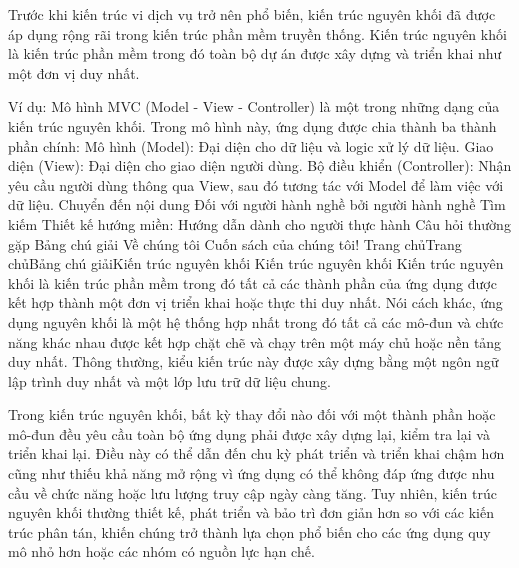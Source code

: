 Trước khi kiến trúc vi dịch vụ trở nên phổ biến, kiến trúc nguyên khối đã được áp dụng rộng rãi trong kiến trúc phần mềm truyền thống. Kiến trúc nguyên khối là kiến trúc phần mềm trong đó toàn bộ dự án được xây dựng và triển khai như một đơn vị duy nhất.

Ví dụ: Mô hình MVC (Model - View - Controller) là một trong những dạng của kiến trúc nguyên khối.
Trong mô hình này, ứng dụng được chia thành ba thành phần chính:
Mô hình (Model): Đại diện cho dữ liệu và logic xử lý dữ liệu.
Giao diện (View): Đại diện cho giao diện người dùng.
Bộ điều khiển (Controller): Nhận yêu cầu người dùng thông qua View, sau đó tương tác với Model để làm việc với dữ liệu.
Chuyển đến nội dung
Đối với người hành nghề bởi người hành nghề
Tìm kiếm
Thiết kế hướng miền: Hướng dẫn dành cho người thực hành
Câu hỏi thường gặp
Bảng chú giải
Về chúng tôi
Cuốn sách của chúng tôi!
Trang chủTrang chủBảng chú giảiKiến trúc nguyên khối
Kiến trúc nguyên khối
Kiến trúc nguyên khối là kiến ​​trúc phần mềm trong đó tất cả các thành phần của ứng dụng được kết hợp thành một đơn vị triển khai hoặc thực thi duy nhất. Nói cách khác, ứng dụng nguyên khối là một hệ thống hợp nhất trong đó tất cả các mô-đun và chức năng khác nhau được kết hợp chặt chẽ và chạy trên một máy chủ hoặc nền tảng duy nhất. Thông thường, kiểu kiến ​​trúc này được xây dựng bằng một ngôn ngữ lập trình duy nhất và một lớp lưu trữ dữ liệu chung.

Trong kiến ​​trúc nguyên khối, bất kỳ thay đổi nào đối với một thành phần hoặc mô-đun đều yêu cầu toàn bộ ứng dụng phải được xây dựng lại, kiểm tra lại và triển khai lại. Điều này có thể dẫn đến chu kỳ phát triển và triển khai chậm hơn cũng như thiếu khả năng mở rộng vì ứng dụng có thể không đáp ứng được nhu cầu về chức năng hoặc lưu lượng truy cập ngày càng tăng. Tuy nhiên, kiến ​​trúc nguyên khối thường thiết kế, phát triển và bảo trì đơn giản hơn so với các kiến ​​trúc phân tán, khiến chúng trở thành lựa chọn phổ biến cho các ứng dụng quy mô nhỏ hơn hoặc các nhóm có nguồn lực hạn chế.

